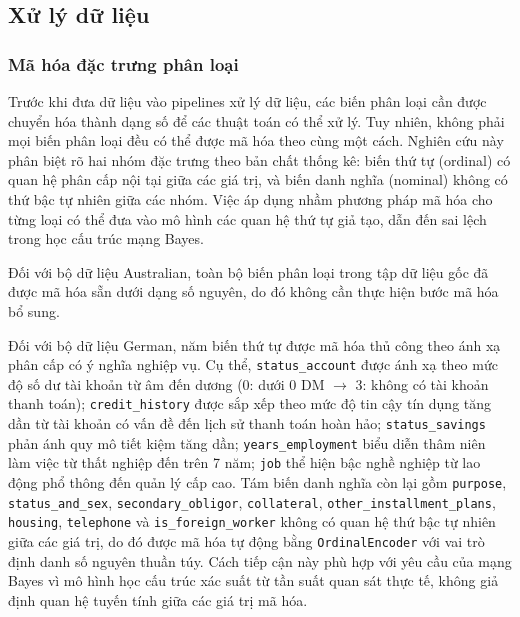 \subsection{Xử lý dữ liệu}
\subsubsection{Mã hóa đặc trưng phân loại}
\noindent
Trước khi đưa dữ liệu vào pipelines xử lý dữ liệu, các biến phân loại cần được chuyển hóa thành dạng số để các thuật toán có thể xử lý. Tuy nhiên, không phải mọi biến phân loại đều có thể được mã hóa theo cùng một cách. Nghiên cứu này phân biệt rõ hai nhóm đặc trưng theo bản chất thống kê: biến thứ tự (ordinal) có quan hệ phân cấp nội tại giữa các giá trị, và biến danh nghĩa (nominal) không có thứ bậc tự nhiên giữa các nhóm. Việc áp dụng nhầm phương pháp mã hóa cho từng loại có thể đưa vào mô hình các quan hệ thứ tự giả tạo, dẫn đến sai lệch trong học cấu trúc mạng Bayes.

Đối với bộ dữ liệu Australian, toàn bộ biến phân loại trong tập dữ liệu gốc đã được mã hóa sẵn dưới dạng số nguyên, do đó không cần thực hiện bước mã hóa bổ sung.

Đối với bộ dữ liệu German, năm biến thứ tự được mã hóa thủ công theo ánh xạ phân cấp có ý nghĩa nghiệp vụ. Cụ thể, \texttt{status\_account} được ánh xạ theo mức độ số dư tài khoản từ âm đến dương (0: dưới 0 DM $\rightarrow$ 3: không có tài khoản thanh toán); \texttt{credit\_history} được sắp xếp theo mức độ tin cậy tín dụng tăng dần từ tài khoản có vấn đề đến lịch sử thanh toán hoàn hảo; \texttt{status\_savings} phản ánh quy mô tiết kiệm tăng dần; \texttt{years\_employment} biểu diễn thâm niên làm việc từ thất nghiệp đến trên 7 năm; \texttt{job} thể hiện bậc nghề nghiệp từ lao động phổ thông đến quản lý cấp cao. Tám biến danh nghĩa còn lại gồm \texttt{purpose}, \texttt{status\_and\_sex}, \texttt{secondary\_obligor}, \texttt{collateral}, \texttt{other\_installment\_plans}, \texttt{housing}, \texttt{telephone} và \texttt{is\_foreign\_worker} không có quan hệ thứ bậc tự nhiên giữa các giá trị, do đó được mã hóa tự động bằng \texttt{OrdinalEncoder} với vai trò định danh số nguyên thuần túy. Cách tiếp cận này phù hợp với yêu cầu của mạng Bayes vì mô hình học cấu trúc xác suất từ tần suất quan sát thực tế, không giả định quan hệ tuyến tính giữa các giá trị mã hóa.

